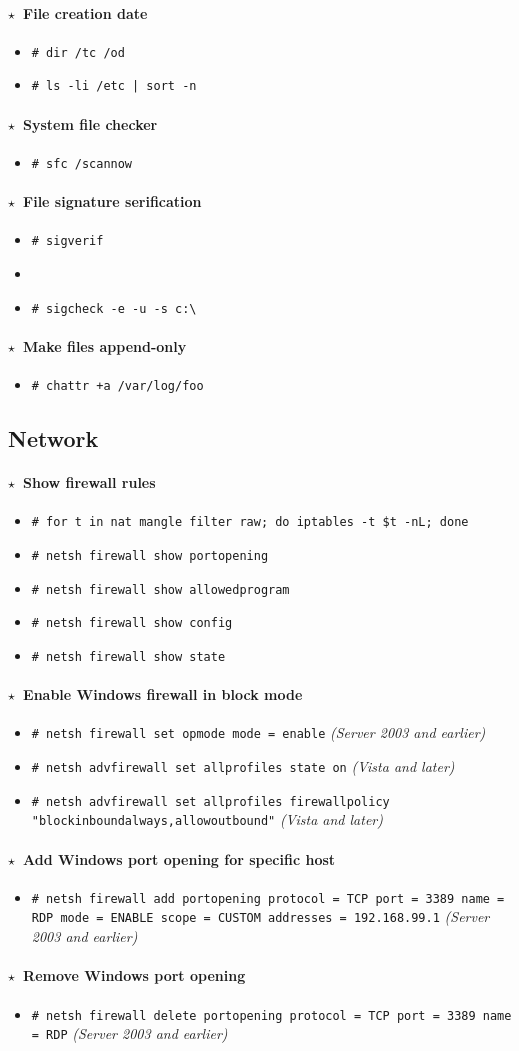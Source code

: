 \documentclass[10pt,landscape]{article}
\newcommand{\os}[1]{\texttt{\footnotesize{#1}}}
\newcommand{\unix}{\os{U}}
\newcommand{\linux}{\os{L}}
\newcommand{\windows}{\os{W}}
\newenvironment{action}[1]
  {\paragraph{$\star$~#1}\begin{itemize}[leftmargin=1cm]}
  {\end{itemize}}
\newcommand{\cmd}[2]{\item[#1] {\small\tt\# #2}}
\newcommand{\tool}[2]{\item[#1] {\footnotesize\sc{#2}}\xspace}
\begin{document}
\begin{multicols*}{3}
\begin{action}{File creation date}
\cmd{\windows}{dir /tc /od}
\cmd{\unix}{ls -li /etc | sort -n}
\end{action}

\begin{action}{System file checker }
\cmd{\windows}{sfc /scannow}
\end{action}

\begin{action}{File signature serification}
\cmd{\windows}{sigverif}
\tool{\windows}{sigcheck}
\cmd{\windows}{sigcheck -e -u -s c:{\textbackslash} }
\end{action}

\begin{action}{Make files append-only}
\cmd{\linux}{chattr +a /var/log/foo}
\end{action}

\subsection*{Network}

\begin{action}{Show firewall rules}
\cmd{\linux}{for t in nat mangle filter raw; do iptables -t \$t -nL; done}
\cmd{\windows}{netsh firewall show portopening}
\cmd{\windows}{netsh firewall show allowedprogram}
\cmd{\windows}{netsh firewall show config}
\cmd{\windows}{netsh firewall show state}
\end{action}

\begin{action}{Enable Windows firewall in block mode}
    \cmd{\windows}{netsh firewall set opmode mode = enable} \emph{(Server 2003 and earlier)}
    \cmd{\windows}{netsh advfirewall set allprofiles state on} \emph{(Vista and later)}
    \cmd{\windows}{netsh advfirewall set allprofiles firewallpolicy "blockinboundalways,allowoutbound"} \emph{(Vista and later)}
\end{action}

\begin{action}{Add Windows port opening for specific host}
\cmd{\windows}{netsh firewall add portopening protocol = TCP port = 3389 name = RDP mode = ENABLE scope = CUSTOM addresses = 192.168.99.1} \emph{(Server 2003 and earlier)}
\end{action}

\begin{action}{Remove Windows port opening}
\cmd{\windows}{netsh firewall delete portopening protocol = TCP port = 3389 name = RDP} \emph{(Server 2003 and earlier)}
\end{action}


\end{multicols*}
\end{document}

